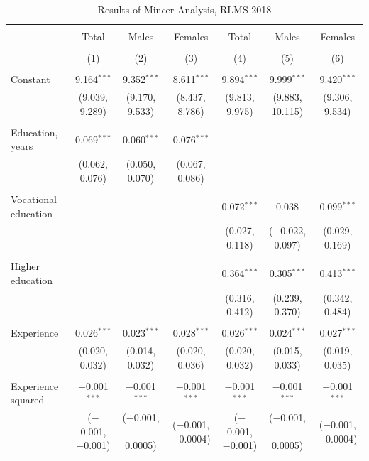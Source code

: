 \documentclass[12pt,a4paper]{article}
\numberwithin{equation}{section}
\begin{document}
\begin{landscape}
	
	\fontsize{9}{11}
	\selectfont
	
	\begin{table}[!htbp] \centering 
		\caption{Results of Mincer Analysis, RLMS 2018} 
		\label{} 
		\begin{tabular}{@{\extracolsep{5pt}}lcccccc} 
			\\[-1.8ex]\hline 
			\hline \\[-1.8ex] 
			& Total & Males & Females & Total & Males & Females \\ 
			\\[-1.8ex] & (1) & (2) & (3) & (4) & (5) & (6)\\ 
			\hline \\[-1.8ex] 
			Constant & 9.164$^{***}$ & 9.352$^{***}$ & 8.611$^{***}$ & 9.894$^{***}$ & 9.999$^{***}$ & 9.420$^{***}$ \\ 
			& (9.039, 9.289) & (9.170, 9.533) & (8.437, 8.786) & (9.813, 9.975) & (9.883, 10.115) & (9.306, 9.534) \\ 
			& & & & & & \\ 
			Education, years & 0.069$^{***}$ & 0.060$^{***}$ & 0.076$^{***}$ &  &  &  \\ 
			& (0.062, 0.076) & (0.050, 0.070) & (0.067, 0.086) &  &  &  \\ 
			& & & & & & \\ 
			Vocational education &  &  &  & 0.072$^{***}$ & 0.038 & 0.099$^{***}$ \\ 
			&  &  &  & (0.027, 0.118) & ($-$0.022, 0.097) & (0.029, 0.169) \\ 
			& & & & & & \\ 
			Higher education &  &  &  & 0.364$^{***}$ & 0.305$^{***}$ & 0.413$^{***}$ \\ 
			&  &  &  & (0.316, 0.412) & (0.239, 0.370) & (0.342, 0.484) \\ 
			& & & & & & \\ 
			Experience & 0.026$^{***}$ & 0.023$^{***}$ & 0.028$^{***}$ & 0.026$^{***}$ & 0.024$^{***}$ & 0.027$^{***}$ \\ 
			& (0.020, 0.032) & (0.014, 0.032) & (0.020, 0.036) & (0.020, 0.032) & (0.015, 0.033) & (0.019, 0.035) \\ 
			& & & & & & \\ 
			Experience squared & $-$0.001$^{***}$ & $-$0.001$^{***}$ & $-$0.001$^{***}$ & $-$0.001$^{***}$ & $-$0.001$^{***}$ & $-$0.001$^{***}$ \\ 
			& ($-$0.001, $-$0.001) & ($-$0.001, $-$0.0005) & ($-$0.001, $-$0.0004) & ($-$0.001, $-$0.001) & ($-$0.001, $-$0.0005) & ($-$0.001, $-$0.0004) \\ 

\end{tabular}
\end{table}
\end{landscape}
\end{document}
